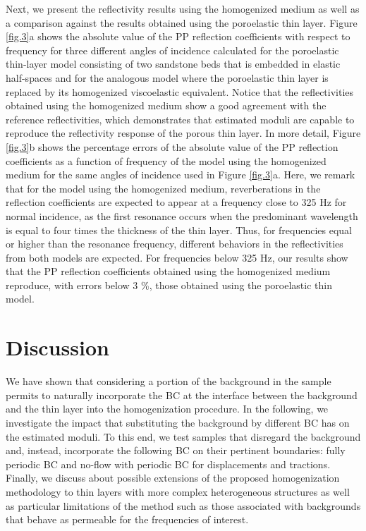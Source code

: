 \documentclass[draft]{agujournal2019}
\begin{document}
Next, we present the reflectivity results using the homogenized medium as well as a comparison against the results obtained using the poroelastic thin layer. 
Figure \ref{fig.3}a shows the absolute value of the PP reflection coefficients with respect to frequency for three different angles of incidence calculated for the poroelastic thin-layer model consisting of two sandstone beds that is embedded in elastic half-spaces and for the analogous model where the poroelastic thin layer is replaced by its homogenized viscoelastic equivalent. Notice that the reflectivities obtained using the homogenized medium show a good agreement with the reference reflectivities, which demonstrates that estimated moduli are capable to reproduce the reflectivity response of the porous thin layer. In more detail,
Figure \ref{fig.3}b shows the percentage errors of the absolute value of the PP reflection coefficients as a function of frequency of the model using the homogenized medium for the same angles of incidence used in Figure \ref{fig.3}a. 
Here, we remark that for the model using the homogenized medium, reverberations in the reflection coefficients are expected to appear at a frequency close to 325 Hz for normal incidence, as the first resonance occurs when the predominant wavelength is  equal to four times the thickness of the thin layer. Thus, for frequencies equal or higher than the resonance frequency, different behaviors in the reflectivities from both models are expected. For frequencies below 325 Hz, our results show that the PP reflection coefficients obtained using the homogenized medium reproduce, with errors below 3 \%, those obtained using the poroelastic thin model. 

\section{Discussion} 
We have shown that considering a portion of the background in the sample permits to  naturally incorporate the BC at the interface between the background and the thin layer into the homogenization procedure. In the following, we investigate the impact that substituting the background by different BC has on the estimated moduli. To this end, we test samples that disregard the background and, instead, incorporate the following BC on their pertinent boundaries: fully periodic BC and  no-flow with periodic BC for displacements and tractions. Finally, we discuss about possible extensions of the proposed homogenization methodology to thin layers with more complex heterogeneous structures as well as  particular limitations of the method such as those associated with backgrounds that behave as permeable for the frequencies of interest.
\end{document}
